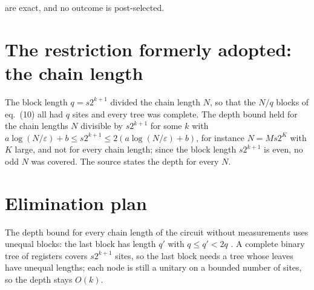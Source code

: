 \documentclass{article}
\begin{document}
are exact, and no outcome is post-selected.

\section{The restriction formerly adopted: the chain length}
The block length $q=s2^{k+1}$ divided the chain length $N$, so that the $N/q$
blocks of eq.~(10) all had $q$ sites and every tree was complete. The depth
bound held for the chain lengths $N$ divisible by $s2^{k+1}$ for some $k$ with
$a\log(N/\varepsilon)+b\le s2^{k+1}\le2(a\log(N/\varepsilon)+b)$, for instance
$N=Ms2^K$ with $K$ large, and not for every chain length; since the block length
$s2^{k+1}$ is even, no odd $N$ was covered. The source states the depth for every
$N$.

\section{Elimination plan}
The depth bound for every chain length of the circuit without measurements
uses unequal blocks: the last block has length $q'$ with $q\le q'<2q$
\cite{gap:mswc24_depth_upper_bound_divisible_length}. A complete binary tree of
registers covers $s2^{k+1}$ sites, so the last block needs a tree whose leaves
have unequal lengths; each node is still a unitary on a bounded number of sites,
so the depth stays $O(k)$.
\end{document}
